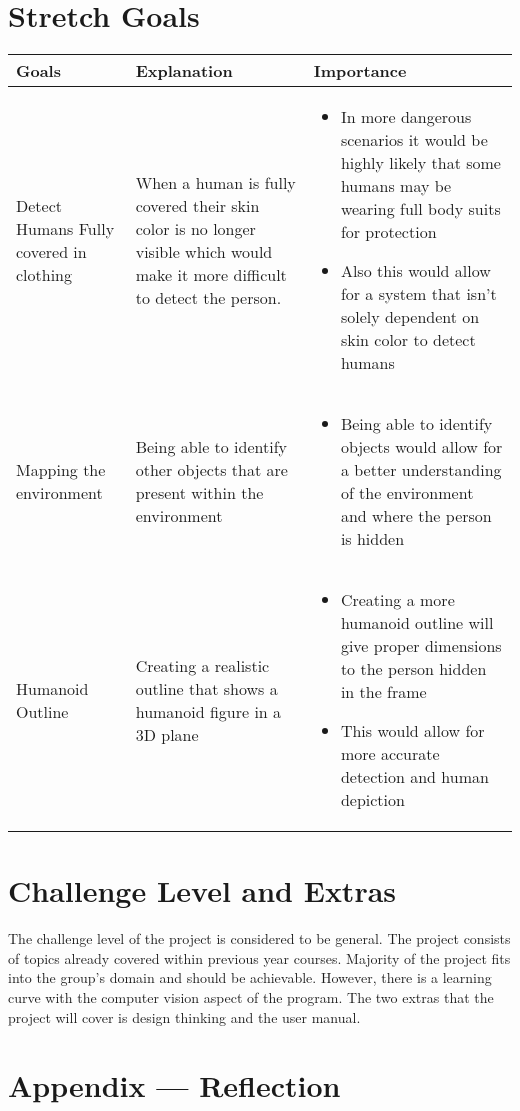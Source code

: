 \documentclass{article}
\begin{document}
\section{Stretch Goals}
    \begin{tabular}{ |p{3cm}|p{3cm}|p{6cm}|  }
    \hline
    Goals & Explanation & Importance \\
    \hline
    Detect Humans Fully covered in clothing  & When a human is fully covered their skin color is no longer visible which would make it more difficult to detect the person.     & 
    \begin{itemize}
      \item In more dangerous scenarios it would be highly likely that some humans may be wearing full body suits for protection
      \item Also this would allow for a system that isn’t solely dependent on skin color to detect humans 
    \end{itemize}\\
    \hline
    Mapping the environment & Being able to identify other objects that are present within the environment    & 
    \begin{itemize}
      \item Being able to identify objects would allow for a better understanding of the environment and where the person is hidden 
    \end{itemize}\\
    \hline
    Humanoid Outline & Creating a realistic outline that shows a humanoid figure in a 3D plane    & 
    \begin{itemize}
      \item Creating a more humanoid outline will give proper dimensions to the person hidden in the frame
      \item This would allow for more accurate detection and human depiction 
    \end{itemize}\\
    \hline
    \end{tabular}

\section{Challenge Level and Extras}

The challenge level of the project is considered to be general. The project consists of topics 
already covered within previous year courses. Majority of the project fits into the group's domain
 and should be achievable. However, there is a learning curve with the computer vision aspect of 
 the program. The two extras that the project will cover is design thinking and the user manual.

\newpage{}

\section*{Appendix --- Reflection}

   
\end{document}
